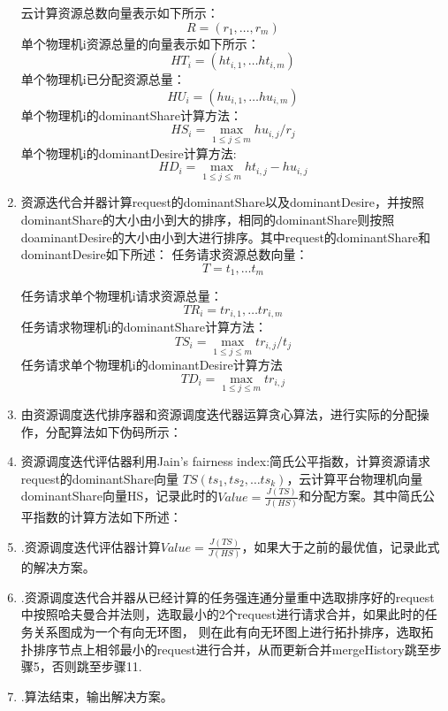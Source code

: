\begin{enumerate}
云计算资源总数向量表示如下所示：
\begin{equation}
R=\left({r}_{1},…,{r}_{m}\right)
\end{equation}
单个物理机i资源总量的向量表示如下所示：
\begin{equation}
{HT}_{i}=\left({ht}_{i,1},…{ht}_{i,m} \right)
\end{equation}
单个物理机i已分配资源总量：
\begin{equation}
{HU}_{i}=\left({hu}_{i,1},…{hu}_{i,m}\right)
\end{equation}
单个物理机i的dominantShare计算方法：
\begin{equation}
{HS}_{i} = \max \limits_{1 \leq j \leq m} {hu}_{i,j}/{{r}_{j}} 
\end{equation}
单个物理机i的dominantDesire计算方法:
\begin{equation}
{HD}_{i}=\max \limits_{1 \leq j \leq m } {ht}_{i,j}-{hu}_{i,j} 
\end{equation}
\item 资源迭代合并器计算request的dominantShare以及dominantDesire，并按照dominantShare的大小由小到大的排序，相同的dominantShare则按照doaminantDesire的大小由小到大进行排序。其中request的dominantShare和dominantDesire如下所述：
任务请求资源总数向量：
\begin{equation}
T={t}_{1},…{t}_{m}
\end{equation}

任务请求单个物理机i请求资源总量：
\begin{equation}
{TR}_{i}={tr}_{i,1},…{tr}_{i,m}
\end{equation}
任务请求物理机i的dominantShare计算方法：
\begin{equation}
{TS}_{i}=\max \limits_{1 \leq j \leq m} {{tr}_{i,j}}/{{t}_{j}}
\end{equation}
任务请求单个物理机i的dominantDesire计算方法
\begin{equation}
{TD}_{i}=\max \limits_{1 \leq j \leq m} {tr}_{i,j}
\end{equation}

\item 由资源调度迭代排序器和资源调度迭代器运算贪心算法，进行实际的分配操作，分配算法如下伪码所示：
\item 资源调度迭代评估器利用Jain’s fairness index:简氏公平指数，计算资源请求request的dominantShare向量
$TS\left({ts}_{1},{ts}_{2},…{ts}_{k}\right )$，云计算平台物理机向量dominantShare向量HS，记录此时的$Value = \frac{J(TS)}{J(HS)}$和分配方案。其中简氏公平指数的计算方法如下所述：
\item.资源调度迭代评估器计算$Value = \frac{J(TS)}{J(HS)}$，如果大于之前的最优值，记录此式的解决方案。
\item.资源调度迭代合并器从已经计算的任务强连通分量重中选取排序好的request中按照哈夫曼合并法则，选取最小的2个request进行请求合并，如果此时的任务关系图成为一个有向无环图，
则在此有向无环图上进行拓扑排序，选取拓扑排序节点上相邻最小的request进行合并，从而更新合并mergeHistory跳至步骤5，否则跳至步骤11.
\item.算法结束，输出解决方案。
\end{enumerate}

